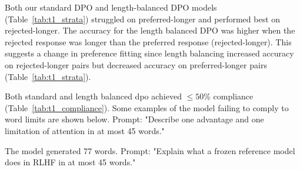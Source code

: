 \documentclass{article}
\begin{document}
\begin{table}[htbp]
\begin{minipage}[t]{0.56\linewidth}
    \centering
    \caption{Length-Stratified Preference Accuracy ($n=237$).}
    \label{tab:t1_strata}
    \small
\end{minipage}\hfill
\begin{minipage}[t]{0.42\linewidth}
    \centering
    \caption{Word-Limit Compliance ($10$ prompts).}
    \label{tab:t1_compliance}
    \small
\end{minipage}
\end{table}

 Both our standard DPO and length-balanced DPO models (Table~\ref{tab:t1_strata}) struggled on preferred-longer and performed best on rejected-longer. The accuracy for the length balanced DPO was higher when the rejected response was longer than the preferred response (rejected-longer). This suggests a change in preference fitting since length balancing increased accuracy on rejected-longer pairs but decreased accuracy on preferred-longer pairs (Table~\ref{tab:t1_strata}).    

Both standard and length balanced dpo achieved $\leq50\%$ compliance (Table~\ref{tab:t1_compliance}). Some examples of the model failing to comply to word limits are shown below. 
Prompt: "Describe one advantage and one limitation of attention in at most 45 words."

The model generated 77 words.
Prompt: "Explain what a frozen reference model does in RLHF in at most 45 words."
\end{document}
